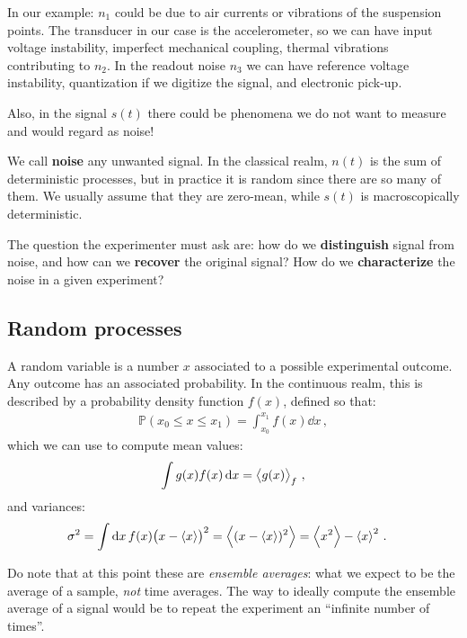 \documentclass[main.tex]{subfiles}
\begin{document}
In our example: \(n_1 \) could be due to air currents or vibrations of the suspension points.
The transducer in our case is the accelerometer, so we can have input voltage instability, imperfect mechanical coupling, thermal vibrations contributing to \(n_2 \). 
In the readout noise \(n_3 \) we can have reference voltage instability, quantization if we digitize the signal, and electronic pick-up.

Also, in the signal \(s(t)\) there could be phenomena we do not want to measure and would regard as noise! 



We call \textbf{noise} any unwanted signal. 
In the classical realm, \(n(t)\) is the sum of deterministic processes, but in practice it is random since there are so many of them. We usually assume that they are zero-mean, while \(s(t)\) is macroscopically deterministic.

The question the experimenter must ask are: how do we \textbf{distinguish} signal from noise, and how can we \textbf{recover} the original signal? How do we \textbf{characterize} the noise in a given experiment? 

\subsection{Random processes}

A random variable is a number \(x\) associated to a possible experimental outcome. Any outcome has an associated probability.
In the continuous realm, this is described by a probability density function \(f(x)\), defined so that: 
%
\begin{align}
\mathbb{P} (x_0 \leq x \leq x_1 ) =  \int_{x_0 }^{x_1 } f(x) \dd{x}
\,,
\end{align}
%
which we can use to compute mean values:
%
\begin{align}
\int g(x) f(x) \dd{x} = \expval{g(x)}_{f}
\,,
\end{align}
%
and variances:
%
\begin{align}
\sigma^2  &= \int \dd{x} f(x) \qty(x - \expval{x})^2 = \expval{(x - \expval{x})^2} = \expval{x^2} - \expval{x}^2
\,.
\end{align}

Do note that at this point these are \emph{ensemble averages}: what we expect to be the average of a sample, \emph{not} time averages. 
The way to ideally compute the ensemble average of a signal would be to repeat the experiment an ``infinite number of times''. 
\end{document}
